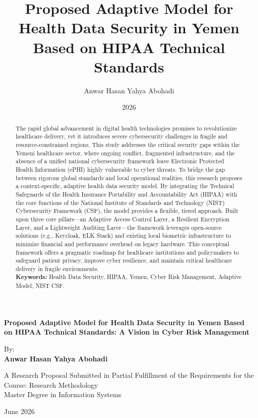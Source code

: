\documentclass[12pt, a4paper, oneside]{report}
\title{\textbf{Proposed Adaptive Model for Health Data Security in Yemen Based on HIPAA Technical Standards}}
\author{Anwar Hasan Yahya Abohadi}
\date{2026}
\begin{document}
	
	\begin{titlepage}
		\begin{center}
			\vspace*{4.5cm}
			
			{\Large \bf Proposed Adaptive Model for Health Data Security in Yemen Based on HIPAA Technical Standards: A Vision in Cyber Risk Management} \\
			\vspace{2cm}
			
			{\large By:} \\
			{\large \textbf{Anwar Hasan Yahya Abohadi}} \\
			\vspace{2cm}
			
			{\large A Research Proposal Submitted in Partial Fulfillment of the Requirements for the Course: Research Methodology \\ Master Degree in Information Systems} \\
			\vspace{2.5cm}
			
			{\large June 2026}
		\end{center}
	\end{titlepage}
	
	
	\begin{abstract}
		The rapid global advancement in digital health technologies promises to revolutionize healthcare delivery, yet it introduces severe cybersecurity challenges in fragile and resource-constrained regions. This study addresses the critical security gaps within the Yemeni healthcare sector, where ongoing conflict, fragmented infrastructure, and the absence of a unified national cybersecurity framework leave Electronic Protected Health Information (ePHI) highly vulnerable to cyber threats. To bridge the gap between rigorous global standards and local operational realities, this research proposes a context-specific, adaptive health data security model. By integrating the Technical Safeguards of the Health Insurance Portability and Accountability Act (HIPAA) with the core functions of the National Institute of Standards and Technology (NIST) Cybersecurity Framework (CSF), the model provides a flexible, tiered approach. Built upon three core pillars—an Adaptive Access Control Layer, a Resilient Encryption Layer, and a Lightweight Auditing Layer—the framework leverages open-source solutions (e.g., Keycloak, ELK Stack) and existing local biometric infrastructure to minimize financial and performance overhead on legacy hardware. This conceptual framework offers a pragmatic roadmap for healthcare institutions and policymakers to safeguard patient privacy, improve cyber resilience, and maintain critical healthcare delivery in fragile environments. \\
		\noindent  \textbf{Keywords:}
		Health Data Security, HIPAA, Yemen, Cyber Risk Management, Adaptive Model, NIST CSF.
	\end{abstract}
	\newpage
	
\end{document}
